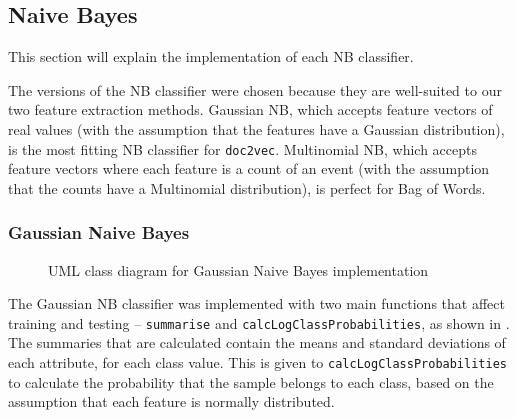 \documentclass[12pt,a4paper,twoside,openright]{report}
\begin{document}
\subsection{Naive Bayes}
\label{sec:impNB}
This section will explain the implementation of each NB classifier.

The versions of the NB classifier were chosen because they are
well-suited to our two feature extraction methods. Gaussian NB, which accepts
feature vectors of real values (with the assumption that the features have a Gaussian distribution),
is the most fitting NB classifier for \texttt{doc2vec}. Multinomial NB,
which accepts feature vectors where each feature is a count of an event (with the assumption
that the counts have a Multinomial distribution), is perfect for Bag of Words.

\subsubsection{Gaussian Naive Bayes}
\label{sec:impGNB}

\begin{figure}[H]
\centering
{}
\caption{UML class diagram for Gaussian Naive Bayes implementation}
\label{fig:UMLGNB}
\end{figure}

The Gaussian NB classifier was implemented with two main functions that affect training
and testing -- \texttt{summarise} and \texttt{calcLogClassProbabilities}, as shown in .
The summaries that are calculated contain the means and standard deviations of each attribute, for each
class value. This is given to \texttt{calcLogClassProbabilities} to calculate the probability
that the sample belongs to each class, based on the assumption that each feature is normally distributed.
\end{document}
